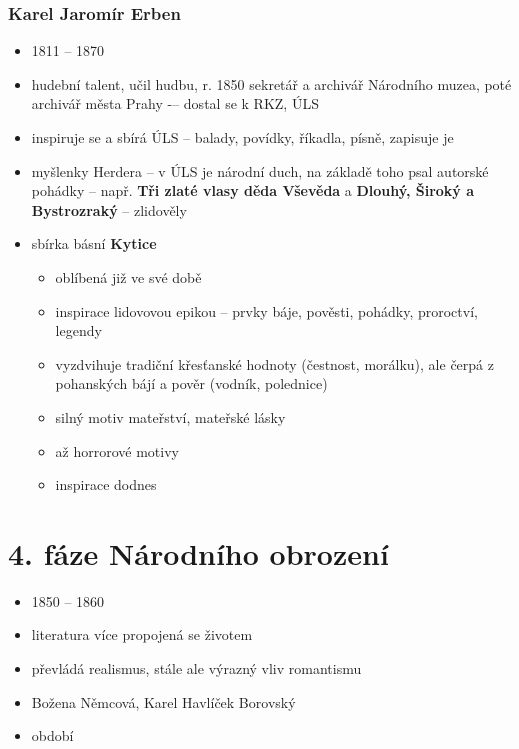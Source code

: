 \documentclass{article}
\begin{document}
\section{Karel Jaromír Erben}
\begin{itemize}
  \item 1811 -- 1870
  \item hudební talent, učil hudbu, r. 1850 sekretář a archivář Národního muzea, poté archivář města Prahy -– dostal se k RKZ, ÚLS
  \item inspiruje se a sbírá ÚLS -- balady, povídky, říkadla, písně, zapisuje je
  \item myšlenky Herdera -- v ÚLS je národní duch, na základě toho psal autorské pohádky -- např. \textbf{Tři zlaté vlasy děda Vševěda} a \textbf{Dlouhý, Široký a Bystrozraký} -- zlidověly
  \item sbírka básní \textbf{Kytice}
  \begin{itemize}
    \item oblíbená již ve své době
    \item inspirace lidovovou epikou -- prvky báje, pověsti, pohádky, proroctví, legendy
    \item vyzdvihuje tradiční křesťanské hodnoty (čestnost, morálku), ale čerpá z pohanských bájí a pověr (vodník, polednice)
    \item silný motiv mateřství, mateřské lásky
    \item až horrorové motivy
    \item inspirace dodnes
  \end{itemize}
\end{itemize}

\part{4. fáze Národního obrození}
\begin{itemize}
  \item 1850 -- 1860
  \item literatura více propojená se životem
  \item převládá realismus, stále ale výrazný vliv romantismu
  \item Božena Němcová, Karel Havlíček Borovský
  \item období 
\end{itemize}
\end{document}
